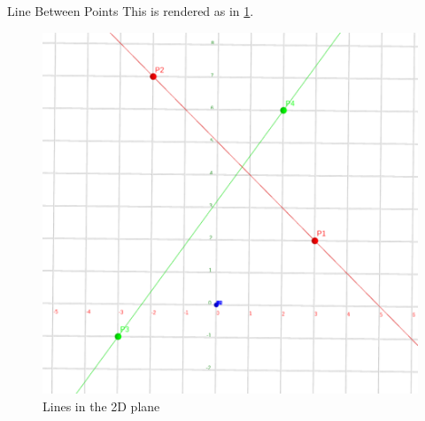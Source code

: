 \documentclass[twocolumn]{article}
\begin{document}
\begin{section}{Line Between Points}
      This is rendered as in \cref{fig:lines}.

      \begin{figure}
        \centering
        \includegraphics[width=0.85\linewidth]{./res/2.png}
        \caption{Lines in the 2D plane}
        \label{fig:lines}
      \end{figure}

    \end{section}
\end{document}

